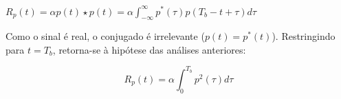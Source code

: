 \begin{center}
    $R_p(t) =  \alpha p(t) \star p(t) = \alpha \int_{-\infty}^{\infty} p^*(\tau) p(T_b-t+\tau) d\tau$
\end{center}

Como o sinal é real, o conjugado é irrelevante ($p(t)=p^*(t)$). Restringindo para $t=T_b$, retorna-se à hipótese das análises anteriores:

\begin{equation} \label{corr:1}
    R_p(t) = \alpha \int_{0}^{T_b} p^2(\tau) d\tau
\end{equation}


\begin{comment}
A integral de autocorrelação de $p(t)$ pode ser dada em termos da convolução com uma das parcelas conjugadas:

\begin{center}
    $R_p(t) =  \alpha p(t) \ast p^*(-t) = \alpha \int_{-\infty}^{\infty} p(\tau) p^*(\tau-t) d\tau$
\end{center}

Como $p(t)$ é real, ter-se-á $p(t) = p^*(t)$. Com $t = t - T_b$:

\begin{center}
    $R_p(t) = \alpha \int_{-\infty}^{\infty} p(\tau) p(\tau-t+T_b) d\tau$
\end{center}

Finalmente amostrando a $t=T_b$:

\begin{equation} \label{CORR}
    R_p(T_b) = \alpha \int_{0}^{T_b} p^2(\tau) d\tau
\end{equation}

\end{comment}















